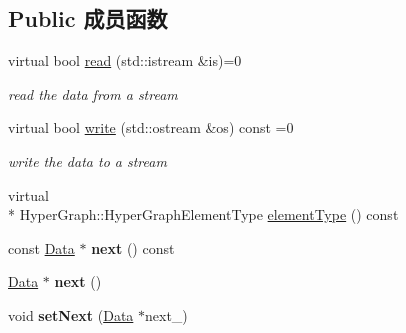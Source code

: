 \subsection*{Public 成员函数}
\begin{DoxyCompactItemize}
\item 
\hypertarget{classg2o_1_1OptimizableGraph_1_1Data_a4a206c86daba1b47425199befd2e1ed4}{virtual bool \hyperlink{classg2o_1_1OptimizableGraph_1_1Data_a4a206c86daba1b47425199befd2e1ed4}{read} (std\-::istream \&is)=0}\label{classg2o_1_1OptimizableGraph_1_1Data_a4a206c86daba1b47425199befd2e1ed4}

\begin{DoxyCompactList}\small\item\em read the data from a stream \end{DoxyCompactList}\item 
\hypertarget{classg2o_1_1OptimizableGraph_1_1Data_ad80cd8ea8013c54c766684ec0ef3daa3}{virtual bool \hyperlink{classg2o_1_1OptimizableGraph_1_1Data_ad80cd8ea8013c54c766684ec0ef3daa3}{write} (std\-::ostream \&os) const =0}\label{classg2o_1_1OptimizableGraph_1_1Data_ad80cd8ea8013c54c766684ec0ef3daa3}

\begin{DoxyCompactList}\small\item\em write the data to a stream \end{DoxyCompactList}\item 
virtual \\*
Hyper\-Graph\-::\-Hyper\-Graph\-Element\-Type \hyperlink{classg2o_1_1OptimizableGraph_1_1Data_aa549949b0bf442face4e3b06d1934706}{element\-Type} () const 
\item 
\hypertarget{classg2o_1_1OptimizableGraph_1_1Data_a7438fd566ec8b29680f13cffd2cf85f3}{const \hyperlink{classg2o_1_1OptimizableGraph_1_1Data}{Data} $\ast$ {\bfseries next} () const }\label{classg2o_1_1OptimizableGraph_1_1Data_a7438fd566ec8b29680f13cffd2cf85f3}

\item 
\hypertarget{classg2o_1_1OptimizableGraph_1_1Data_af9c0427357f1e81f9008c3173fddf34c}{\hyperlink{classg2o_1_1OptimizableGraph_1_1Data}{Data} $\ast$ {\bfseries next} ()}\label{classg2o_1_1OptimizableGraph_1_1Data_af9c0427357f1e81f9008c3173fddf34c}

\item 
\hypertarget{classg2o_1_1OptimizableGraph_1_1Data_a5811aac3f8eab3c19207663e946b343b}{void {\bfseries set\-Next} (\hyperlink{classg2o_1_1OptimizableGraph_1_1Data}{Data} $\ast$next\-\_\-)}\label{classg2o_1_1OptimizableGraph_1_1Data_a5811aac3f8eab3c19207663e946b343b}

\end{DoxyCompactItemize}
